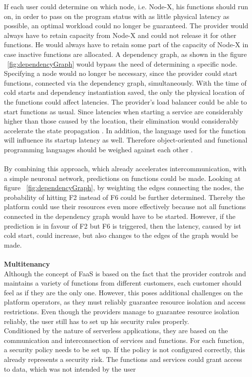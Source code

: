 \documentclass[a4paper,twoside,11pt, pagesize]{scrartcl}
\begin{document}
\begin{spacing}{1.2}
If each user could determine on which node, i.e. Node-X, his functions should run on, in order to pass on the program status with as little physical latency as possible, an optimal workload could no longer be guaranteed. The provider would always have to retain capacity from Node-X and could not release it for other functions. He would always have to retain some part of the capacity of Node-X in case inactive functions are allocated. A dependency graph, as shown in the figure ~\ref{fig:dependencyGraph} would bypass the need of determining a specific node. Specifying a node would no longer be necessary, since the provider could start functions, connected via the dependency graph, simultaneously. With the time of cold starts and dependency instantiation saved, the only the physical location of the functions could affect latencies. The provider's load balancer could be able to start functions as usual. Since latencies when starting a service are considerably higher than those caused by the location, their elimination would considerably accelerate the state propagation \cite{aditya2019will} \cite{jackson2018investigation}. In addition, the language used for the function will influence its startup latency as well. Therefore object-oriented and functional programming languages should be weighed against each other \cite{manner2018cold}.\\\\ By combining this approach, which already accelerates intercommunication, with a simple neuronal network, predictions on functions could be made. Looking at figure ~\ref{fig:dependencyGraph}, by weighting the edges connecting the nodes, the probability of hitting F2 instead of F6 could be further determined. Thereby the platform could use their resources even more effectively because not all functions connected in the dependency graph would have to be started. However, if the prediction is in favour of F2 but F6 is triggered, then the latency, caused by ist cold start, could increase, but also changes to the edges of the graph would be made.\\\\ \textbf{Multitenancy}\\ Although the concept of FaaS is based on the fact that the provider controls and maintains a variety of functions from different customers, each customer should feel as if they are the only one. However, this poses additional challenges on the platform operators, as they must reliably guarantee resource isolation and access restrictions. Even though the providers manage to guarantee resource isolation reliably, the user still has to set up his security rules properly.\\ Conditioned by the nature of serverless applications, they are based on the communication and interconnection of services and functions. For each function, a security policy needs to be set up. If the policy is not configured correctly, this already represents a security risk. The functions and services could grant access to data, which was not intended by the user 
\end{spacing}
\end{document}
